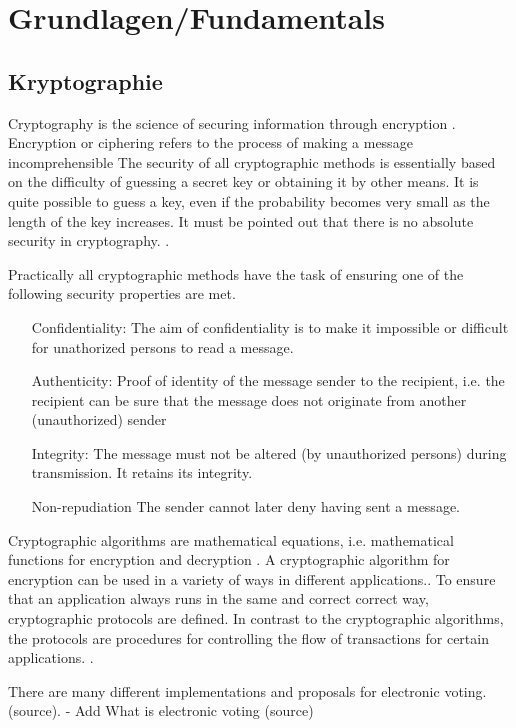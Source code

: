 \chapter{Grundlagen/Fundamentals}
\section{Kryptographie}

Cryptography is the science of securing information through encryption \cite[18]{crypto}. Encryption or ciphering refers to the process of making a message incomprehensible \cite[18]{crypto} The security of all cryptographic methods is essentially based on the difficulty of guessing a secret key or obtaining it by other means. It is quite possible to guess a key, even if the probability becomes very small as the length of the key increases. It must be pointed out that there is no absolute security in cryptography. \cite[25]{crypto}.

Practically all cryptographic methods have the task of ensuring one of the following security properties are met. \cite[18]{crypto}
\begin{itemize}
    \item[Confidentiality:] The aim of confidentiality is to make it impossible or difficult for unathorized persons to read a message.
    \item[Authenticity:] Proof of identity of the message sender to the recipient, i.e. the recipient can be sure that the message does not originate from another (unauthorized) sender
    \item[Integrity:] The message must not be altered (by unauthorized persons) during transmission. It retains its integrity.
    \item[Non-repudiation] The sender cannot later deny having sent a message.
\end{itemize}

Cryptographic algorithms are mathematical equations, i.e. mathematical functions for encryption and decryption \cite[19]{crypto}. A cryptographic algorithm for encryption can be used in a variety of ways in different applications.\cite[22]{eg-spec}. To ensure that an application always runs in the same and correct correct way, cryptographic protocols are defined. In contrast to the cryptographic algorithms, the protocols are procedures for controlling the flow of transactions for certain applications. \cite[22]{eg-spec}.

There are many different implementations and proposals for electronic voting. (source).
- Add What is electronic voting (source)


